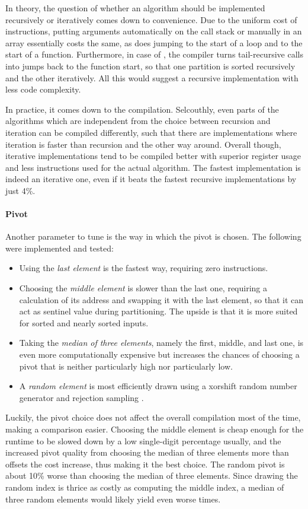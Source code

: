 In theory, the question of whether an algorithm should be implemented recursively or iteratively comes down to convenience.
Due to the uniform cost of instructions, putting arguments automatically on the call stack or manually in an array essentially costs the same, as does jumping to the start of a loop and to the start of a function.
Furthermore, in case of \QS{}, the compiler turns tail-recursive calls into jumps back to the function start, so that one partition is sorted recursively and the other iteratively.
All this would suggest a recursive implementation with less code complexity.

In practice, it comes down to the compilation.
Selcouthly, even parts of the algorithms which are independent from the choice between recursion and iteration can be compiled differently, such that there are implementations where iteration is faster than recursion and the other way around.
Overall though, iterative implementations tend to be compiled better with superior register usage and less instructions used for the actual \QS{} algorithm.
The fastest implementation is indeed an iterative one, even if it beats the fastest recursive implementations by just 4\%.

\paragraph{Pivot}
Another parameter to tune is the way in which the pivot is chosen.
The following were implemented and tested:
\begin{itemize}
	\item
	Using the \emph{last element} is the fastest way, requiring zero instructions.

	\item
	Choosing the \emph{middle element} is slower than the last one, requiring a calculation of its address and swapping it with the last element, so that it can act as sentinel value during partitioning.
	The upside is that it is more suited for sorted and nearly sorted inputs.

	\item
	Taking the \emph{median of three elements}, namely the first, middle, and last one, is even more computationally expensive but increases the chances of choosing a pivot that is neither particularly high nor particularly low.

	\item
	A \emph{random element} is most efficiently drawn using a xorshift random number generator and rejection sampling \cite{lukas_geis}.
\end{itemize}
Luckily, the pivot choice does not affect the overall compilation most of the time, making a comparison easier.
Choosing the middle element is cheap enough for the runtime to be slowed down by a low single-digit percentage usually, and the increased pivot quality from choosing the median of three elements more than offsets the cost increase, thus making it the best choice.
The random pivot is about 10\% worse than choosing the median of three elements.
Since drawing the random index is thrice as costly as computing the middle index, a median of three random elements would likely yield even worse times.




